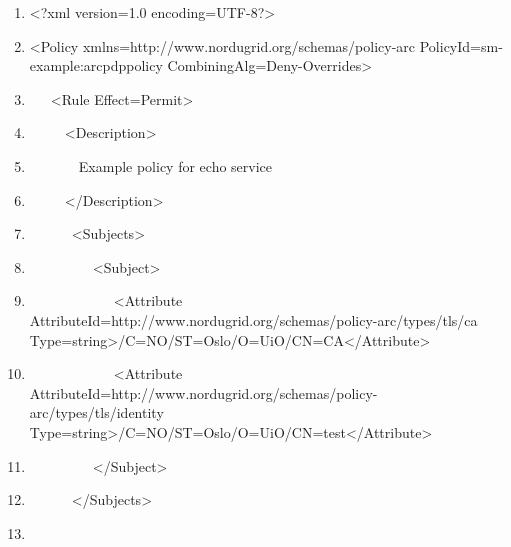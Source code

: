 \documentclass{article}
\newcommand\liststyleWWviiiNumxiv{%
\renewcommand\theenumi{\arabic{enumi}}
\renewcommand\theenumii{\arabic{enumii}}
\renewcommand\theenumiii{\arabic{enumiii}}
\renewcommand\theenumiv{\arabic{enumiv}}
\renewcommand\labelenumi{\theenumi.}
\renewcommand\labelenumii{\theenumii.}
\renewcommand\labelenumiii{\theenumiii.}
\renewcommand\labelenumiv{\theenumiv.}
}
\begin{document}
\liststyleWWviiiNumxiv
\begin{enumerate}
\item {\ttfamily\color{black}
{\textless}?xml version={\textquotedbl}1.0{\textquotedbl}
encoding={\textquotedbl}UTF-8{\textquotedbl}?{\textgreater}}
\item {\ttfamily\color{black}
{\textless}Policy
xmlns={\textquotedbl}http://www.nordugrid.org/schemas/policy-arc{\textquotedbl}
PolicyId={\textquotedbl}sm-example:arcpdppolicy{\textquotedbl}
CombiningAlg={\textquotedbl}Deny-Overrides{\textquotedbl}{\textgreater}}
\item {\ttfamily\color{black}
\ \ \ {\textless}Rule
Effect={\textquotedbl}Permit{\textquotedbl}{\textgreater}}
\item {\ttfamily\color{black}
\ \ \ \ \ {\textless}Description{\textgreater}}
\item {\ttfamily\color{black}
\ \ \ \ \ \ \ Example policy for echo service}
\item {\ttfamily\color{black}
\ \ \ \ \ {\textless}/Description{\textgreater}}
\item {\ttfamily\color{black}
\ \ \ \ \ \ {\textless}Subjects{\textgreater}}
\item {\ttfamily\color{black}
\ \ \ \ \ \ \ \ \ {\textless}Subject{\textgreater}}
\item {\ttfamily\color{black}
\ \ \ \ \ \ \ \ \ \ \ \ {\textless}Attribute
AttributeId={\textquotedbl}http://www.nordugrid.org/schemas/policy-arc/types/tls/ca{\textquotedbl}
Type={\textquotedbl}string{\textquotedbl}{\textgreater}/C=NO/ST=Oslo/O=UiO/CN=CA{\textless}/Attribute{\textgreater}}
\item {\ttfamily\color{black}
\ \ \ \ \ \ \ \ \ \ \ \ {\textless}Attribute
AttributeId={\textquotedbl}http://www.nordugrid.org/schemas/policy-arc/types/tls/identity{\textquotedbl}
Type={\textquotedbl}string{\textquotedbl}{\textgreater}/C=NO/ST=Oslo/O=UiO/CN=test{\textless}/Attribute{\textgreater}}
\item {\ttfamily\color{black}
\ \ \ \ \ \ \ \ \ {\textless}/Subject{\textgreater}}
\item {\ttfamily\color{black}
\ \ \ \ \ \ {\textless}/Subjects{\textgreater}}
\item {\ttfamily\color{black}
}
\end{enumerate}
\end{document}
